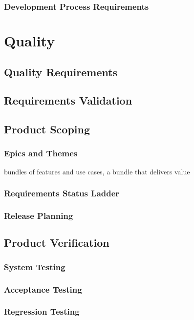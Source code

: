 \documentclass{reqengbook}
\begin{document}
\section{Development Process Requirements}


\part{Quality} %

\chapter{Quality Requirements}

\chapter{Requirements Validation}

\chapter{Product Scoping}

\section{Epics and Themes}

bundles of features and use cases, a bundle that delivers value

\section{Requirements Status Ladder}

\section{Release Planning} 

\chapter{Product Verification}
\section{System Testing}
\section{Acceptance Testing}
\section{Regression Testing}
\end{document}
